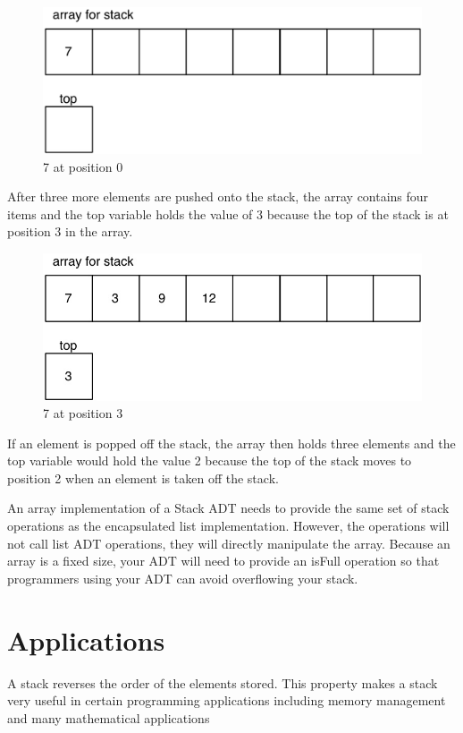\begin{figure}[H]
\centering
\includegraphics{pictures/arrayStackOne.jpg}
\caption{7 at position 0}
\label{fig:stack1}
\end{figure}
 After three more elements are pushed onto the stack, the array contains four items and the top variable holds the value of 3 because the top of the stack is at position 3 in the array.
\begin{figure}[H]
\centering
\includegraphics{pictures/arrayStacksTwo.jpg}
\caption{7 at position 3}
\label{fig:stack2}
\end{figure}


If an element is popped off the stack, the array then holds three elements and the top variable would hold the value 2 because the top of the stack moves to position 2 when an element is taken off the stack.

An array implementation of a Stack ADT needs to provide the same set of stack operations as the encapsulated list implementation.   However, the operations will not call list ADT operations, they will directly manipulate the array. Because an array is a fixed size, your ADT will need to provide an isFull operation so that programmers using your ADT can avoid overflowing your stack.

\section{Applications}
    A stack reverses the order of the elements stored. This property makes a
    stack very useful in certain programming applications including memory
    management and many mathematical applications

